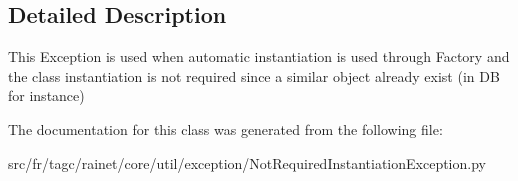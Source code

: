 \subsection{Detailed Description}
This Exception is used when automatic instantiation is used through Factory and the class instantiation is not required since a similar object already exist (in D\-B for instance) 

The documentation for this class was generated from the following file\-:\begin{DoxyCompactItemize}
\item 
src/fr/tagc/rainet/core/util/exception/Not\-Required\-Instantiation\-Exception.\-py\end{DoxyCompactItemize}
